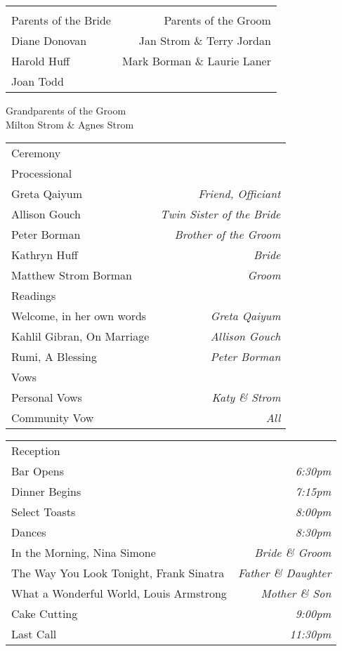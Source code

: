 \documentclass[11pt]{article}
\makeatletter
\newcommand*\ColText[1]{\textcolor{Goldenrod3}{#1}}
\newenvironment{Group}[1]
  {\noindent\begin{tabular*}{\textwidth}{@{}p{.7\textwidth}@{\extracolsep{\fill}}r@{}}
    {\fontsize{24}{29}\selectfont\ColText{#1}}\\[0.8em]}
  {\end{tabular*}}
\newcommand*\CenteredEntry[1]{%
  \sffamily #1}
\newcommand*\CenteredExpl[1]{%
  \footnotesize #1}
\newcommand*\LREntry[2]{%
  \sffamily #1 & \sffamily #2}
\newcommand*\LRExpl[2]{%
  \footnotesize #1 & \footnotesize #2}
\newcommand*\Entry[2]{%
  \sffamily #1 & \footnotesize\textit{#2}}
\newcommand*\Expl[2]{%
  \hspace*{1em}\footnotesize #1 & \footnotesize\textit{#2}}
\makeatother
\begin{document}
\begin{Group}{}
\LREntry{Parents of the Bride}{Parents of the Groom} \\
\LRExpl{Diane Donovan}{Jan Strom \& Terry Jordan} \\
\LRExpl{Harold Huff}{Mark Borman \& Laurie Laner} \\
\LRExpl{Joan Todd}{}
\end{Group}
\begin{center}
\CenteredEntry{Grandparents of the Groom} \\
\CenteredExpl{Milton Strom \& Agnes Strom}
\end{center}

\vfill

\begin{Group}{Ceremony}
\Entry{Processional}{}\\
\Expl{Greta Qaiyum}{Friend, Officiant}\\
\Expl{Allison Gouch}{Twin Sister of the Bride}\\
\Expl{Peter Borman}{Brother of the Groom}\\
\Expl{Kathryn Huff}{Bride}\\
\Expl{Matthew Strom Borman}{Groom}\\
\Entry{Readings}{} \\
\Expl{Welcome, in her own words}{Greta Qaiyum} \\
\Expl{Kahlil Gibran, On Marriage}{Allison Gouch} \\
\Expl{Rumi, A Blessing}{Peter Borman} \\
\Entry{Vows}{} \\
\Expl{Personal Vows}{Katy \& Strom}\\
\Expl{Community Vow}{All}\\
\end{Group}

\vfill

\begin{Group}{Reception}
\Entry{Bar Opens}{6:30pm} \\
\Entry{Dinner Begins}{7:15pm} \\ 
\Entry{Select Toasts}{8:00pm} \\
\Entry{Dances}{8:30pm} \\
\Expl{In the Morning, Nina Simone}{Bride \& Groom} \\
\Expl{The Way You Look Tonight, Frank Sinatra}{Father \& Daughter} \\
\Expl{What a Wonderful World, Louis Armstrong}{Mother \& Son} \\
\Entry{Cake Cutting}{9:00pm} \\
\Entry{Last Call}{11:30pm}
\end{Group}
\end{document}
